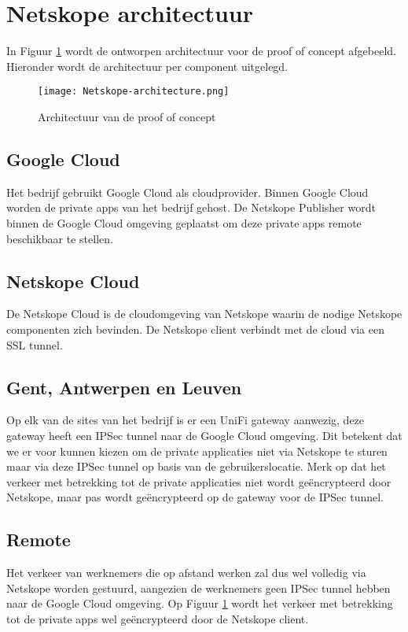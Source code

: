 \section{Netskope architectuur}
In Figuur \ref{fig:poc-architecture} wordt de ontworpen architectuur voor de proof of concept afgebeeld. Hieronder wordt de architectuur per component uitgelegd.
\begin{figure}[H]
    \centering
    \texttt{[image: Netskope-architecture.png]}
    \caption[Architectuur van de POC]{Architectuur van de proof of concept}
    \label{fig:poc-architecture}
\end{figure}
  
\subsection{Google Cloud}
Het bedrijf gebruikt Google Cloud als cloudprovider. Binnen Google Cloud worden de private apps van het bedrijf gehost. De Netskope Publisher wordt binnen de Google Cloud omgeving geplaatst om deze private apps remote beschikbaar te stellen. 

\subsection{Netskope Cloud}
De Netskope Cloud is de cloudomgeving van Netskope waarin de nodige Netskope componenten zich bevinden. De Netskope client verbindt met de cloud via een SSL tunnel.

\subsection{Gent, Antwerpen en Leuven}
Op elk van de sites van het bedrijf is er een UniFi gateway aanwezig, deze gateway heeft een IPSec tunnel naar de Google Cloud omgeving. Dit betekent dat we er voor kunnen kiezen om de private applicaties niet via Netskope te sturen maar via deze IPSec tunnel op basis van de gebruikerslocatie. Merk op dat het verkeer met betrekking tot de private applicaties niet wordt geëncrypteerd door Netskope, maar pas wordt geëncrypteerd op de gateway voor de IPSec tunnel.

\subsection{Remote}
Het verkeer van werknemers die op afstand werken zal dus wel volledig via Netskope worden gestuurd, aangezien de werknemers geen IPSec tunnel hebben naar de Google Cloud omgeving. Op Figuur \ref{fig:poc-architecture} wordt het verkeer met betrekking tot de private apps wel geëncrypteerd door de Netskope client.

